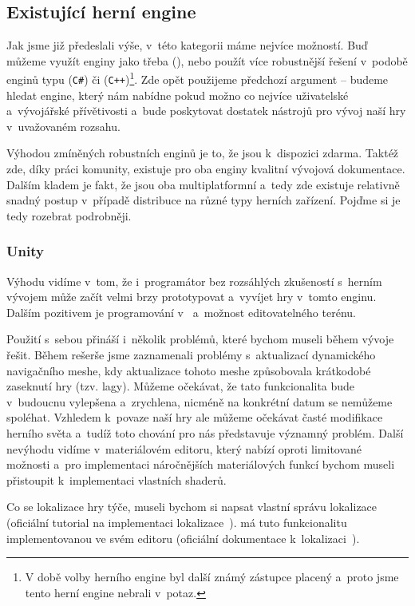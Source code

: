 \subsection{Existující herní engine}
Jak jsme již předeslali výše, v~této kategorii máme nejvíce možností. Buď můžeme využít enginy jako třeba \OG{} (\CPP{}), nebo použít více robustnější řešení v~podobě enginů typu \UN{} (\texttt{C\#}) či \UE{} (\texttt{C++})\footnote{V době volby herního engine byl další známý zástupce \CRY{} placený a~proto jsme tento herní engine nebrali v~potaz.}. Zde opět použijeme předchozí argument -- budeme hledat engine, který nám nabídne pokud možno co nejvíce uživatelské a~vývojářské přívětivosti a~bude poskytovat dostatek nástrojů pro vývoj naší hry v~uvažovaném rozsahu.

Výhodou zmíněných robustních enginů je to, že jsou k~dispozici zdarma. Taktéž zde, díky práci komunity, existuje pro oba enginy kvalitní vývojová dokumentace. Dalším kladem je fakt, že jsou oba multiplatformní a~tedy zde existuje relativně snadný postup v~případě distribuce na různé typy herních zařízení. Pojďme si je tedy rozebrat podrobněji.

\subsubsection{Unity}
Výhodu \UN{} vidíme v~tom, že i~programátor bez rozsáhlých zkušeností s~herním vývojem může začít velmi brzy prototypovat a~vyvíjet hry v~tomto enginu. Dalším pozitivem je programování v~\CS{} a~možnost editovatelného terénu.

Použití \UN{} s~sebou přináší i~několik problémů, které bychom museli během vývoje řešit. Během rešerše jsme zaznamenali problémy s~aktualizací dynamického navigačního meshe, kdy aktualizace tohoto meshe způsobovala krátkodobé zaseknutí hry (tzv. lagy). Můžeme očekávat, že tato funkcionalita bude v~budoucnu vylepšena a~zrychlena, nicméně na konkrétní datum se nemůžeme spoléhat. Vzhledem k~povaze naší hry ale můžeme očekávat časté modifikace herního světa a~tudíž toto chování pro nás představuje významný problém. Další nevýhodu vidíme v~materiálovém editoru, který nabízí oproti \UE{} limitované možnosti a~pro implementaci náročnějších materiálových funkcí bychom museli přistoupit k~implementaci vlastních shaderů.

Co se lokalizace hry týče, museli bychom si napsat vlastní správu lokalizace (oficiální tutorial na implementaci lokalizace~\citep{unity_loc}). \UE{} má tuto funkcionalitu implementovanou ve svém editoru (oficiální dokumentace k~lokalizaci~\citep{ue_loc}).


